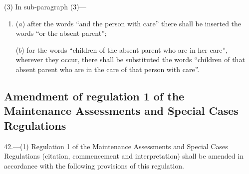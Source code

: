 \documentclass[12pt,a4paper]{article}
\begin{document}
(3) In sub-paragraph (3)—
\begin{enumerate}\item[]
($a$) after the words “and the person with care” there shall be inserted the words “or the absent parent”;

($b$) for the words “children of the absent parent who are in her care”, wherever they occur, there shall be substituted the words “children of that absent parent who are in the care of that person with care”.
\end{enumerate}

\subsection[42. Amendment of regulation 1 of the Maintenance Assessments and Special Cases Regulations]{\sloppy Amendment of regulation 1 of the Maintenance Assessments and Special Cases Regulations}

\begin{sloppypar}
42.—(1) Regulation 1 of the Maintenance Assessments and Special Cases Regulations (citation, commencement and interpretation) shall be amended in accordance with the following provisions of this regulation.
\end{sloppypar}
\end{document}
